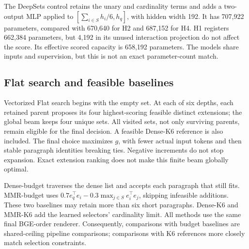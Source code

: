 \documentclass[preprint,12pt]{elsarticle}
\begin{document}
The DeepSets control retains the unary and cardinality terms and adds a two-output MLP applied to $[\sum_{i\in S}h_i/6,h_q]$, with hidden width 192. It has 707,922 parameters, compared with 670,640 for H2 and 687,152 for H4. H1 registers 662,384 parameters, but 4,192 in its unused interaction projection do not affect the score. Its effective scored capacity is 658,192 parameters. The models share inputs and supervision, but this is not an exact parameter-count match.

\subsection{Flat search and feasible baselines}
Vectorized Flat search begins with the empty set. At each of six depths, each retained parent proposes its four highest-scoring feasible distinct extensions; the global beam keeps four unique sets. All visited sets, not only surviving parents, remain eligible for the final decision. A feasible Dense-K6 reference is also included. The final choice maximizes $g$, with fewer actual input tokens and then stable paragraph identities breaking ties. Negative increments do not stop expansion. Exact extension ranking does not make this finite beam globally optimal.

Dense-budget traverses the dense list and accepts each paragraph that still fits. MMR-budget uses $0.7e_q^\top e_i-0.3\max_{j\in S}e_i^\top e_j$, skipping infeasible additions. These two baselines may retain more than six short paragraphs. Dense-K6 and MMR-K6 add the learned selectors' cardinality limit. All methods use the same final BGE-order renderer. Consequently, comparisons with budget baselines are shared-ceiling pipeline comparisons; comparisons with K6 references more closely match selection constraints.
\end{document}
